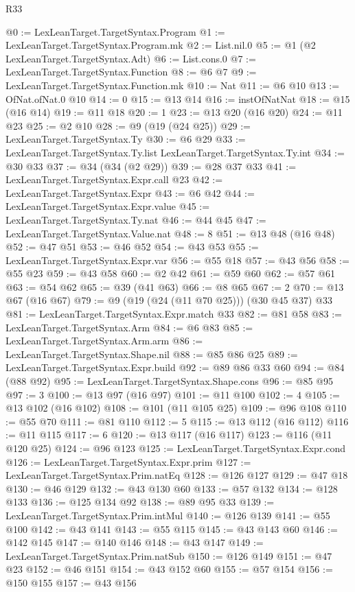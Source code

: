 \begin{lexlean}{R33}
\begin{coremodule}
@0 := LexLeanTarget.TargetSyntax.Program
@1 := LexLeanTarget.TargetSyntax.Program.mk
@2 := List.nil.{0}
@5 := @1 (@2 LexLeanTarget.TargetSyntax.Adt)
@6 := List.cons.{0}
@7 := LexLeanTarget.TargetSyntax.Function
@8 := @6 @7
@9 := LexLeanTarget.TargetSyntax.Function.mk
@10 := Nat
@11 := @6 @10
@13 := OfNat.ofNat.{0} @10
@14 := 0
@15 := @13 @14
@16 := instOfNatNat
@18 := @15 (@16 @14)
@19 := @11 @18
@20 := 1
@23 := @13 @20 (@16 @20)
@24 := @11 @23
@25 := @2 @10
@28 := @9 (@19 (@24 @25))
@29 := LexLeanTarget.TargetSyntax.Ty
@30 := @6 @29
@33 := LexLeanTarget.TargetSyntax.Ty.list LexLeanTarget.TargetSyntax.Ty.int
@34 := @30 @33
@37 := @34 (@34 (@2 @29))
@39 := @28 @37 @33
@41 := LexLeanTarget.TargetSyntax.Expr.call @23
@42 := LexLeanTarget.TargetSyntax.Expr
@43 := @6 @42
@44 := LexLeanTarget.TargetSyntax.Expr.value
@45 := LexLeanTarget.TargetSyntax.Ty.nat
@46 := @44 @45
@47 := LexLeanTarget.TargetSyntax.Value.nat
@48 := 8
@51 := @13 @48 (@16 @48)
@52 := @47 @51
@53 := @46 @52
@54 := @43 @53
@55 := LexLeanTarget.TargetSyntax.Expr.var
@56 := @55 @18
@57 := @43 @56
@58 := @55 @23
@59 := @43 @58
@60 := @2 @42
@61 := @59 @60
@62 := @57 @61
@63 := @54 @62
@65 := @39 (@41 @63)
@66 := @8 @65
@67 := 2
@70 := @13 @67 (@16 @67)
@79 := @9 (@19 (@24 (@11 @70 @25))) (@30 @45 @37) @33
@81 := LexLeanTarget.TargetSyntax.Expr.match @33
@82 := @81 @58
@83 := LexLeanTarget.TargetSyntax.Arm
@84 := @6 @83
@85 := LexLeanTarget.TargetSyntax.Arm.arm
@86 := LexLeanTarget.TargetSyntax.Shape.nil
@88 := @85 @86 @25
@89 := LexLeanTarget.TargetSyntax.Expr.build
@92 := @89 @86 @33 @60
@94 := @84 (@88 @92)
@95 := LexLeanTarget.TargetSyntax.Shape.cons
@96 := @85 @95
@97 := 3
@100 := @13 @97 (@16 @97)
@101 := @11 @100
@102 := 4
@105 := @13 @102 (@16 @102)
@108 := @101 (@11 @105 @25)
@109 := @96 @108
@110 := @55 @70
@111 := @81 @110
@112 := 5
@115 := @13 @112 (@16 @112)
@116 := @11 @115
@117 := 6
@120 := @13 @117 (@16 @117)
@123 := @116 (@11 @120 @25)
@124 := @96 @123
@125 := LexLeanTarget.TargetSyntax.Expr.cond
@126 := LexLeanTarget.TargetSyntax.Expr.prim
@127 := LexLeanTarget.TargetSyntax.Prim.natEq
@128 := @126 @127
@129 := @47 @18
@130 := @46 @129
@132 := @43 @130 @60
@133 := @57 @132
@134 := @128 @133
@136 := @125 @134 @92
@138 := @89 @95 @33
@139 := LexLeanTarget.TargetSyntax.Prim.intMul
@140 := @126 @139
@141 := @55 @100
@142 := @43 @141
@143 := @55 @115
@145 := @43 @143 @60
@146 := @142 @145
@147 := @140 @146
@148 := @43 @147
@149 := LexLeanTarget.TargetSyntax.Prim.natSub
@150 := @126 @149
@151 := @47 @23
@152 := @46 @151
@154 := @43 @152 @60
@155 := @57 @154
@156 := @150 @155
@157 := @43 @156

\end{coremodule}
\end{lexlean}
